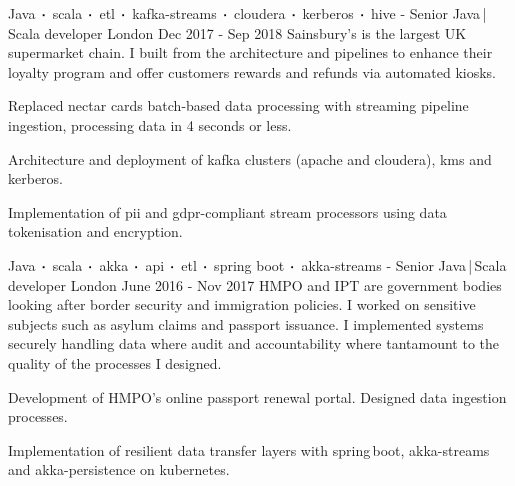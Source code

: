 \begin{cventries}
    \cventry
    {Java$\sqbig$scala$\sqbig$etl$\sqbig$kafka-streams$\sqbig$cloudera$\sqbig$kerberos$\sqbig$hive}
    { - Senior Java\,|\,Scala developer}
    {London}
    {Dec 2017 - Sep 2018}
    {Sainsbury's is the largest UK supermarket chain. I built from the architecture and pipelines to enhance their loyalty program and offer customers rewards and refunds via automated kiosks.}
    {
        \begin{cvitems}
            \item{Replaced nectar cards batch-based data processing with streaming pipeline ingestion, processing data in 4 seconds or less.}
            \item{Architecture and deployment of kafka clusters (apache and cloudera), kms and kerberos.}
            \item{Implementation of pii and gdpr-compliant stream processors using data tokenisation and encryption.}
        \end{cvitems}
    }

    \cventry
    {Java$\sqbig$scala$\sqbig$akka$\sqbig$api$\sqbig$etl$\sqbig$spring boot$\sqbig$akka-streams}
    { - Senior Java\,|\,Scala developer}
    {London}
    {June 2016 - Nov 2017}
    {HMPO and IPT are government bodies looking after border security and immigration policies. I worked on sensitive subjects such as asylum claims and passport issuance. I implemented systems securely handling data where audit and accountability where tantamount to the quality of the processes I designed.}
    {
        \begin{cvitems}
            \item{Development of HMPO's online passport renewal portal. Designed data ingestion processes.}
            \item{Implementation of resilient data transfer layers with spring\,boot, akka-streams and akka-persistence on kubernetes.}
        \end{cvitems}
    }


\end{cventries}
